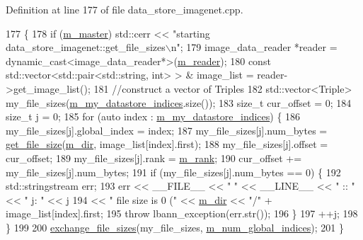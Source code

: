 Definition at line 177 of file data\+\_\+store\+\_\+imagenet.\+cpp.


\begin{DoxyCode}
177                                          \{
178   \textcolor{keywordflow}{if} (\hyperlink{classlbann_1_1generic__data__store_a143fd33ef3a53180bc62745e369c16f8}{m\_master}) std::cerr << \textcolor{stringliteral}{"starting data\_store\_imagenet::get\_file\_sizes\(\backslash\)n"};
179   image\_data\_reader *reader = \textcolor{keyword}{dynamic\_cast<}image\_data\_reader*\textcolor{keyword}{>}(\hyperlink{classlbann_1_1generic__data__store_afa49ced0ab64c632371ea52532a91ec2}{m\_reader});
180   \textcolor{keyword}{const} std::vector<std::pair<std::string, int> > & image\_list = reader->get\_image\_list();
181   \textcolor{comment}{//construct a vector of Triples }
182   std::vector<Triple> my\_file\_sizes(\hyperlink{classlbann_1_1generic__data__store_abd38f8d8aab0648959e09d011abfe20a}{m\_my\_datastore\_indices}.size());
183   \textcolor{keywordtype}{size\_t} cur\_offset = 0;
184   \textcolor{keywordtype}{size\_t} j = 0;
185   \textcolor{keywordflow}{for} (\textcolor{keyword}{auto} index : \hyperlink{classlbann_1_1generic__data__store_abd38f8d8aab0648959e09d011abfe20a}{m\_my\_datastore\_indices}) \{
186     my\_file\_sizes[j].global\_index = index;
187     my\_file\_sizes[j].num\_bytes = \hyperlink{classlbann_1_1generic__data__store_a7641d15eba63426acf5071acb8026442}{get\_file\_size}(\hyperlink{classlbann_1_1generic__data__store_ab479c127f00ce550c7433b90e40a5a3d}{m\_dir}, image\_list[index].first);
188     my\_file\_sizes[j].offset = cur\_offset;
189     my\_file\_sizes[j].rank = \hyperlink{classlbann_1_1generic__data__store_a87695bfd2d1ed0dbe01d99108e3f68b7}{m\_rank};
190     cur\_offset += my\_file\_sizes[j].num\_bytes;
191     \textcolor{keywordflow}{if} (my\_file\_sizes[j].num\_bytes == 0) \{
192       std::stringstream err;
193       err << \_\_FILE\_\_ << \textcolor{stringliteral}{" "} << \_\_LINE\_\_ << \textcolor{stringliteral}{" :: "} << \textcolor{stringliteral}{" j: "} << j 
194         << \textcolor{stringliteral}{" file size is 0 ("} << \hyperlink{classlbann_1_1generic__data__store_ab479c127f00ce550c7433b90e40a5a3d}{m\_dir} << \textcolor{stringliteral}{"/"} + image\_list[index].first;
195       \textcolor{keywordflow}{throw} lbann\_exception(err.str());
196     \}
197     ++j;
198   \}
199 
200   \hyperlink{classlbann_1_1data__store__image_a477529f2ba3f86598bbd409d3c2b6901}{exchange\_file\_sizes}(my\_file\_sizes, \hyperlink{classlbann_1_1generic__data__store_a0dfa2ffa01845b84ca477fb3e14a36c6}{m\_num\_global\_indices});
201 \}
\end{DoxyCode}
